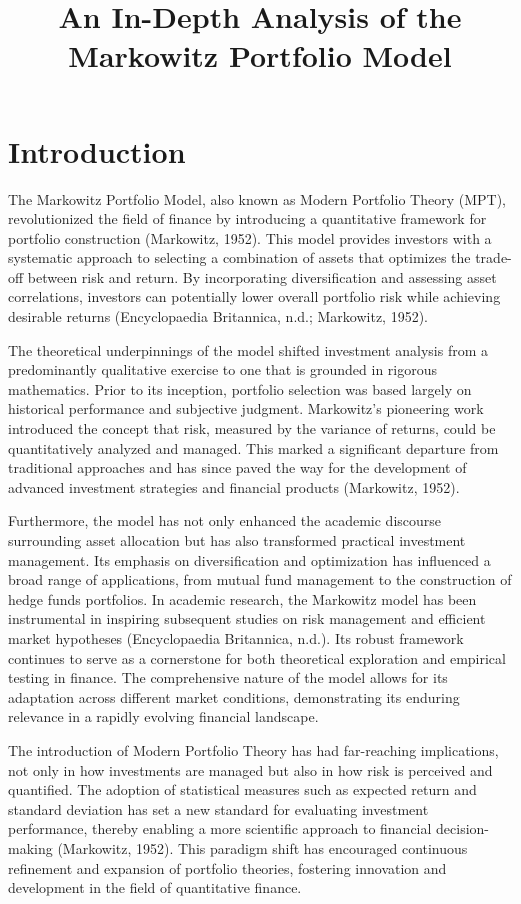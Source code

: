 \documentclass[12pt]{article}
\begin{document}
\title{An In-Depth Analysis of the Markowitz Portfolio Model}
\author{}
\date{}
\maketitle

\section{Introduction}
The Markowitz Portfolio Model, also known as Modern Portfolio Theory (MPT), revolutionized the field of finance by introducing a quantitative framework for portfolio construction (Markowitz, 1952). This model provides investors with a systematic approach to selecting a combination of assets that optimizes the trade-off between risk and return. By incorporating diversification and assessing asset correlations, investors can potentially lower overall portfolio risk while achieving desirable returns (Encyclopaedia Britannica, n.d.; Markowitz, 1952). 

The theoretical underpinnings of the model shifted investment analysis from a predominantly qualitative exercise to one that is grounded in rigorous mathematics. Prior to its inception, portfolio selection was based largely on historical performance and subjective judgment. Markowitz's pioneering work introduced the concept that risk, measured by the variance of returns, could be quantitatively analyzed and managed. This marked a significant departure from traditional approaches and has since paved the way for the development of advanced investment strategies and financial products (Markowitz, 1952).

Furthermore, the model has not only enhanced the academic discourse surrounding asset allocation but has also transformed practical investment management. Its emphasis on diversification and optimization has influenced a broad range of applications, from mutual fund management to the construction of hedge funds portfolios. In academic research, the Markowitz model has been instrumental in inspiring subsequent studies on risk management and efficient market hypotheses (Encyclopaedia Britannica, n.d.). Its robust framework continues to serve as a cornerstone for both theoretical exploration and empirical testing in finance. The comprehensive nature of the model allows for its adaptation across different market conditions, demonstrating its enduring relevance in a rapidly evolving financial landscape.

The introduction of Modern Portfolio Theory has had far-reaching implications, not only in how investments are managed but also in how risk is perceived and quantified. The adoption of statistical measures such as expected return and standard deviation has set a new standard for evaluating investment performance, thereby enabling a more scientific approach to financial decision-making (Markowitz, 1952). This paradigm shift has encouraged continuous refinement and expansion of portfolio theories, fostering innovation and development in the field of quantitative finance.
\end{document}
